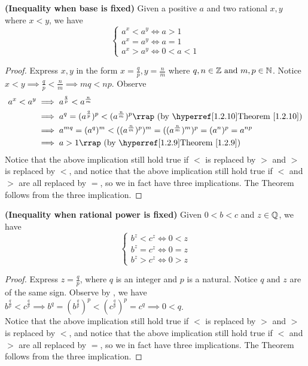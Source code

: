 \documentclass{report}
\begin{document}
\begin{theorem}
\label{1.3.10}
\textbf{(Inequality when base is fixed)} Given a positive $a$ and two rational  $x,y$ where  $x<y$, we have
 \begin{equation}
\begin{cases}
  a^x<a^y\iff a>1\\
  a^x=a^y\iff a=1\\
  a^x>a^y\iff 0<a<1
\end{cases}
\end{equation}
\end{theorem}
\begin{proof}
  Express $x,y$ in the form $x=\frac{q}{p},y=\frac{n}{m}$ where $q,n\in\mathbb{Z}\text{ and }m,p\in\mathbb{N}$. Notice $x<y\implies \frac{q}{p}<\frac{n}{m}\implies mq<np$. Observe
  \begin{align}
    a^x<a^y &\implies a^{\frac{q}{p}}<a^{\frac{n}{m}}\\
  &\implies a^q=(a^{\frac{q}{p}})^p<(a^{\frac{n}{m}})^p\rap{by \myref{Theorem}{1.2.10}}\\
  &\implies a^{mq}=(a^q)^m<((a^{\frac{n}{m}})^p)^m=((a^{\frac{n}{m}})^m)^p=(a^n)^p=a^{np}\\
  &\implies a>1\rap{by \myref{Theorem}{1.2.9}} 
  \end{align}
  Notice that the above implication still hold true if $<$ is replaced by $>$ and $>$ is replaced by  $<$, and notice that the above implication still hold true if $<$ and  $>$ are all replaced by $=$, so we in fact have three implications. The Theorem follows from the three implication.
   
\end{proof}
\begin{theorem}
\label{1.3.11}
\textbf{(Inequality when rational power is fixed)} Given $0<b<c$ and  $z\in\mathbb{Q}$, we have
\begin{equation}
\begin{cases}
  b^z<c^z \iff 0<z\\
  b^z=c^z \iff 0=z\\
  b^z>c^z\iff 0>z
\end{cases}
\end{equation}
\end{theorem}
\begin{proof}
Express $z=\frac{q}{p}$, where $q$ is an integer and $p$ is a natural. Notice $q\text{ and }z$ are of the same sign. Observe by , we have $b^{\frac{q}{p}}<c^{\frac{q}{p}}\implies b^q=(b^{\frac{q}{p}})^p<(c^{\frac{q}{p}})^p=c^q\implies 0<q$.\\

  Notice that the above implication still hold true if $<$ is replaced by $>$ and $>$ is replaced by  $<$, and notice that the above implication still hold true if $<$ and  $>$ are all replaced by $=$, so we in fact have three implications. The Theorem follows from the three implication.
\end{proof}
\end{document}
